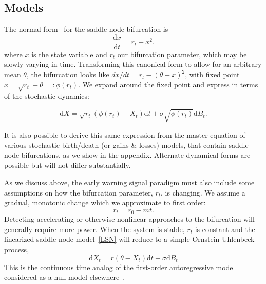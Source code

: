 \documentclass[authoryear,review,11pt]{elsarticle}
\newcommand{\ud}{\mathrm{d}}
\begin{document}
\subsection*{Models}
The normal form~\citep{Guckenheimer1983, Kuehn2011} for the saddle-node bifurcation is
\begin{equation}
\frac{\ud x}{\ud t} = r_t- x^2.
\label{saddle-node}
\end{equation}
where $x$ is the state variable and $r_t$ our bifurcation parameter, which may be slowly varying in time.  
Transforming this canonical form to allow for an arbitrary mean $\theta$,
the bifurcation looks like $ dx/dt = r_t- (\theta-x)^2 $, with fixed point $\hat x = \sqrt{r_t} +\theta =: \phi(r_t)$.
We expand around the fixed point and express in terms of the stochastic dynamics: 

\begin{equation}
\ud X = \sqrt{ r_t } (\phi(r_t) - X_t)\ud t + \sigma\sqrt{\phi(r_t) } \ud B_t. \label{LSN}
\end{equation}

It is also possible to derive this same expression from the master equation of various stochastic birth/death (or gains \& losses) models,
that contain saddle-node bifurcations, as we show in the appendix.  
Alternate dynamical forms are possible but will not differ substantially.  

As we discuss above, the early warning signal paradigm must also include some assumptions on how the bifurcation parameter, $r_t$, is changing. We assume a gradual, monotonic change which we approximate to first order: 
\begin{equation}
r_t = r_0 - m t.
\label{R_t}
\end{equation}
Detecting accelerating or otherwise nonlinear approaches to the bifurcation will generally require more power. When the system is stable, $r_t$ is constant and the linearized saddle-node model~\eqref{LSN} will reduce to a simple Ornstein-Uhlenbeck process, 
\begin{equation}
\ud X_t = r (\theta - X_t) \ud t + \sigma \ud B_t \label{OU}
\end{equation}
This is the continuous time analog of the first-order autoregressive model considered as a null model elsewhere~\citep[\emph{e.g.}][]{Dakos2008, Guttal2008a}. 
\end{document}
